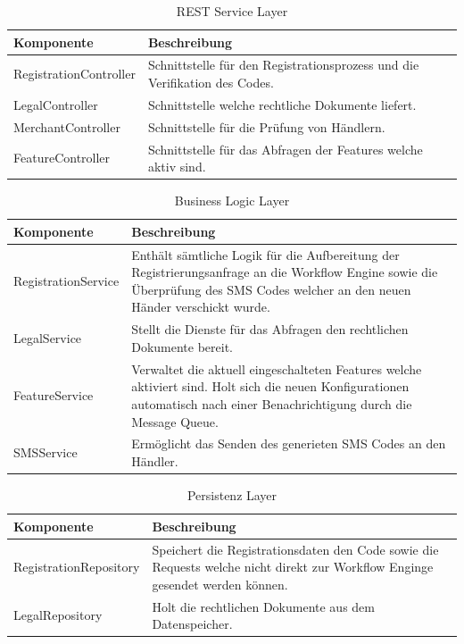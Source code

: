 \begin{table}[H]
	\centering
	\caption{REST Service Layer}
	\begin{tabular}{ | p{4cm} | p{12cm} | }
		\toprule
		{\textbf{Komponente}} & {\textbf{Beschreibung}} \\
		\midrule
		RegistrationController &  Schnittstelle für den Registrationsprozess und die Verifikation des Codes. \\ \hline
		LegalController &  Schnittstelle welche rechtliche Dokumente liefert. \\ \hline
		MerchantController &  Schnittstelle für die Prüfung von Händlern.\\ \hline
		FeatureController & Schnittstelle für das Abfragen der Features welche aktiv sind. \\
		\bottomrule
	\end{tabular}
\end{table}

\begin{table}[H]
	\centering
	\caption{Business Logic Layer}
	\begin{tabular}{ | p{4cm} | p{12cm} | }
		\toprule
		{\textbf{Komponente}} & {\textbf{Beschreibung}} \\
		\midrule
		RegistrationService &  Enthält sämtliche Logik für die Aufbereitung der Registrierungsanfrage an die Workflow Engine sowie die Überprüfung des SMS Codes welcher an den neuen Händer verschickt wurde.\\ \hline
		LegalService &  Stellt die Dienste für das Abfragen den rechtlichen Dokumente bereit. \\ \hline
		FeatureService &  Verwaltet die aktuell eingeschalteten Features welche aktiviert sind. Holt sich die neuen Konfigurationen automatisch nach einer Benachrichtigung durch die Message Queue. \\ \hline
		SMSService & Ermöglicht das Senden des generieten SMS Codes an den Händler.\\
		\bottomrule
	\end{tabular}
\end{table}

\begin{table}[H]
	\centering
	\caption{Persistenz Layer}
	\begin{tabular}{ | p{4cm} | p{12cm} | }
		\toprule
		{\textbf{Komponente}} & {\textbf{Beschreibung}} \\
		\midrule
		RegistrationRepository &  Speichert die Registrationsdaten den Code sowie die Requests welche nicht direkt zur Workflow Enginge gesendet werden können. \\ \hline
		LegalRepository &  Holt die rechtlichen Dokumente aus dem Datenspeicher. \\
		\bottomrule
	\end{tabular}
\end{table}

